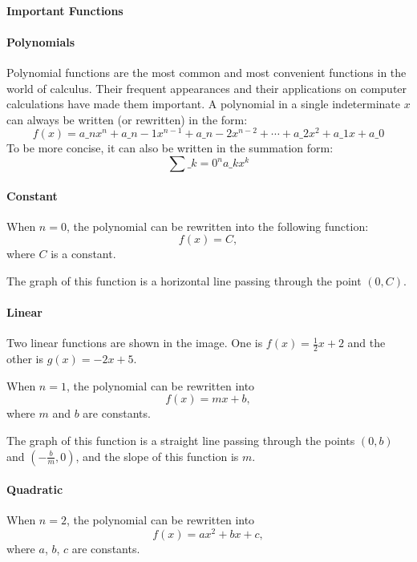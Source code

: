 \paragraph{Important Functions}

\paragraph{Polynomials}

Polynomial functions are the most common and most convenient functions in the world of calculus. Their frequent appearances and their applications on computer calculations have made them important. A polynomial in a single indeterminate $x$ can always be written (or rewritten) in the form:
$$
f(x) = a\_n x^n + a\_{n-1} x^{n-1} + a\_{n-2} x^{n-2} + \cdots + a\_2 x^2 + a\_1 x + a\_0
$$
To be more concise, it can also be written in the summation form:
$$
\sum\_{k=0}^n a\_k x^k
$$
\paragraph{Constant}

When $n = 0$, the polynomial can be rewritten into the following function:
$$
f(x) = C,
$$
where $C$ is a constant.

The graph of this function is a horizontal line passing through the point $(0, C)$.

\paragraph{Linear}

Two linear functions are shown in the image. One is $f(x) = \frac{1}{2}x + 2$ and the other is $g(x) = -2x + 5$. 


When $n = 1$, the polynomial can be rewritten into
$$
f(x) = mx + b,
$$
where $m$ and $b$ are constants.

The graph of this function is a straight line passing through the points $(0, b)$ and $\left(-\frac{b}{m}, 0\right)$, and the slope of this function is $m$.

\paragraph{Quadratic}

When $n = 2$, the polynomial can be rewritten into
$$
f(x) = ax^2 + bx + c,
$$
where $a$, $b$, $c$ are constants.

